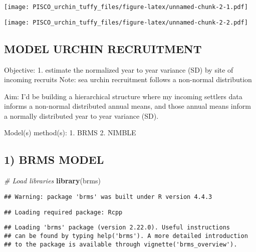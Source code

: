 \documentclass[
]{article}
\newenvironment{Shaded}{\begin{snugshade}}{\end{snugshade}}
\newcommand{\CommentTok}[1]{\textcolor[rgb]{0.56,0.35,0.01}{\textit{#1}}}
\newcommand{\FunctionTok}[1]{\textcolor[rgb]{0.13,0.29,0.53}{\textbf{#1}}}
\newcommand{\NormalTok}[1]{#1}
\newcommand{\SpecialCharTok}[1]{\textcolor[rgb]{0.81,0.36,0.00}{\textbf{#1}}}
\begin{document}
\texttt{[image: PISCO\_urchin\_tuffy\_files/figure-latex/unnamed-chunk-2-1.pdf]}

\begin{Shaded}
\end{Shaded}

\texttt{[image: PISCO\_urchin\_tuffy\_files/figure-latex/unnamed-chunk-2-2.pdf]}

\subsection{MODEL URCHIN RECRUITMENT}\label{model-urchin-recruitment}

Objective: 1. estimate the normalized year to year variance (SD) by site
of incoming recruits Note: sea urchin recruitment follows a non-normal
distribution

Aim: I'd be building a hierarchical structure where my incoming settlers
data informs a non-normal distributed annual means, and those annual
means inform a normally distributed year to year variance (SD).

Model(s) method(s): 1. BRMS 2. NIMBLE

\subsection{1) BRMS MODEL}\label{brms-model}

\begin{Shaded}
\begin{Highlighting}[]
\CommentTok{\# Load libraries}
\FunctionTok{library}\NormalTok{(brms)}
\end{Highlighting}
\end{Shaded}

\begin{verbatim}
## Warning: package 'brms' was built under R version 4.4.3
\end{verbatim}

\begin{verbatim}
## Loading required package: Rcpp
\end{verbatim}

\begin{verbatim}
## Loading 'brms' package (version 2.22.0). Useful instructions
## can be found by typing help('brms'). A more detailed introduction
## to the package is available through vignette('brms_overview').
\end{verbatim}
\end{document}
